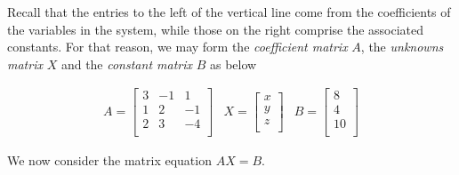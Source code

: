\documentclass{ximera}
\begin{document}

\label{systemasmatrixeqn}

Recall that the entries to the left of the vertical line come from the coefficients of the variables in the system, while those on the right comprise the associated constants.  For that reason, we may form the  \textit{coefficient matrix} $A$, the  \textit{unknowns matrix} $X$  and the  \textit{constant matrix} $B$ as below

\[ \begin{array}{ccc} 

A = \left[ \begin{array}{rrr} 3 & -1 & 1  \\ 1 & 2 & -1  \\ 2 & 3 & -4  \\ \end{array} \right]

&

X = \left[ \begin{array}{r}  x \\  y \\  z \\ \end{array} \right]

&

B = \left[ \begin{array}{r}  8 \\  4 \\  10 \\ \end{array} \right]

\end{array} \]

We now consider the matrix equation $AX = B$.
\end{document}
